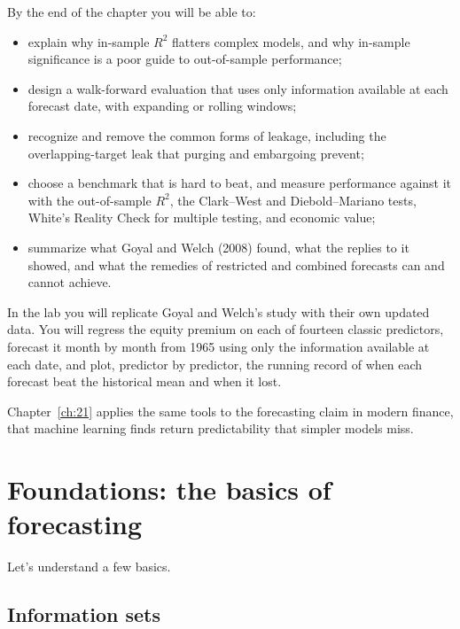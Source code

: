 By the end of the chapter you will be able to:

\begin{itemize}
  \item explain why in-sample $R^2$ flatters complex models, and why in-sample significance is a poor guide to out-of-sample performance;
  \item design a walk-forward evaluation that uses only information available at each forecast date, with expanding or rolling windows;
  \item recognize and remove the common forms of leakage, including the overlapping-target leak that purging and embargoing prevent;
  \item choose a benchmark that is hard to beat, and measure performance against it with the out-of-sample $R^2$, the Clark--West and Diebold--Mariano tests, White's Reality Check for multiple testing, and economic value;
  \item summarize what Goyal and Welch (2008) found, what the replies to it showed, and what the remedies of restricted and combined forecasts can and cannot achieve.
\end{itemize}

In the lab you will replicate Goyal and Welch's study with their own updated data. You will regress the equity premium on each of fourteen classic predictors, forecast it month by month from 1965 using only the information available at each date, and plot, predictor by predictor, the running record of when each forecast beat the historical mean and when it lost. 

Chapter~\ref{ch:21} applies the same tools to the forecasting claim in modern finance, that machine learning finds return predictability that simpler models miss.

\section{Foundations: the basics of forecasting}
\label{sec:05-foundations}

Let's understand a few basics.

\subsection{Information sets}

